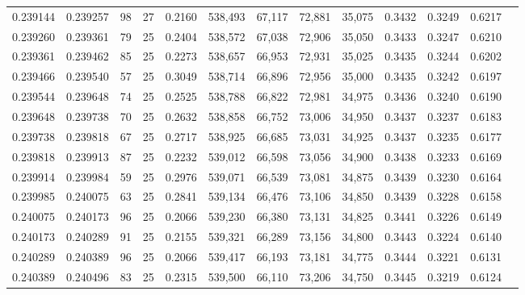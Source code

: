 \begin{tabular}{rrrrrrrrrrrrr}
0.239144 & 0.239257 &    98 &  27 &                                     0.2160 & 538,493 &  67,117 &  72,881 &  35,075 & 0.3432 & 0.3249 & 0.6217 \\
0.239260 & 0.239361 &    79 &  25 &                                     0.2404 & 538,572 &  67,038 &  72,906 &  35,050 & 0.3433 & 0.3247 & 0.6210 \\
0.239361 & 0.239462 &    85 &  25 &                                     0.2273 & 538,657 &  66,953 &  72,931 &  35,025 & 0.3435 & 0.3244 & 0.6202 \\
0.239466 & 0.239540 &    57 &  25 &                                     0.3049 & 538,714 &  66,896 &  72,956 &  35,000 & 0.3435 & 0.3242 & 0.6197 \\
0.239544 & 0.239648 &    74 &  25 &                                     0.2525 & 538,788 &  66,822 &  72,981 &  34,975 & 0.3436 & 0.3240 & 0.6190 \\
0.239648 & 0.239738 &    70 &  25 &                                     0.2632 & 538,858 &  66,752 &  73,006 &  34,950 & 0.3437 & 0.3237 & 0.6183 \\
0.239738 & 0.239818 &    67 &  25 &                                     0.2717 & 538,925 &  66,685 &  73,031 &  34,925 & 0.3437 & 0.3235 & 0.6177 \\
0.239818 & 0.239913 &    87 &  25 &                                     0.2232 & 539,012 &  66,598 &  73,056 &  34,900 & 0.3438 & 0.3233 & 0.6169 \\
0.239914 & 0.239984 &    59 &  25 &                                     0.2976 & 539,071 &  66,539 &  73,081 &  34,875 & 0.3439 & 0.3230 & 0.6164 \\
0.239985 & 0.240075 &    63 &  25 &                                     0.2841 & 539,134 &  66,476 &  73,106 &  34,850 & 0.3439 & 0.3228 & 0.6158 \\
0.240075 & 0.240173 &    96 &  25 &                                     0.2066 & 539,230 &  66,380 &  73,131 &  34,825 & 0.3441 & 0.3226 & 0.6149 \\
0.240173 & 0.240289 &    91 &  25 &                                     0.2155 & 539,321 &  66,289 &  73,156 &  34,800 & 0.3443 & 0.3224 & 0.6140 \\
0.240289 & 0.240389 &    96 &  25 &                                     0.2066 & 539,417 &  66,193 &  73,181 &  34,775 & 0.3444 & 0.3221 & 0.6131 \\
0.240389 & 0.240496 &    83 &  25 &                                     0.2315 & 539,500 &  66,110 &  73,206 &  34,750 & 0.3445 & 0.3219 & 0.6124 \\

\end{tabular}

